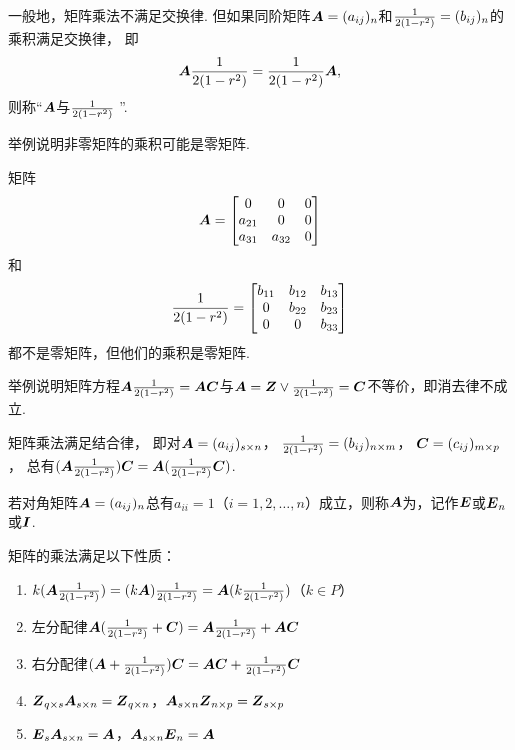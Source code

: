 \begin{definition}
一般地，矩阵乘法不满足交换律.
但如果同阶矩阵\(\A = (a_{ij})_n\)和\(\B = (b_{ij})_n\)的乘积满足交换律，
即\[
	\A \B = \B \A,
\]则称“\(\A\)与\(\B\) ”.
\end{definition}

\begin{example}
举例说明非零矩阵的乘积可能是零矩阵.
\begin{solution}
矩阵\[
\A = \begin{bmatrix}
0 & 0 & 0 \\
a_{21} & 0 & 0 \\
a_{31} & a_{32} & 0 \\
\end{bmatrix}
\]和\[
\B = \begin{bmatrix}
b_{11} & b_{12} & b_{13} \\
0 & b_{22} & b_{23} \\
0 & 0 & b_{33} \\
\end{bmatrix}
\]都不是零矩阵，但他们的乘积是零矩阵.
\end{solution}
\end{example}

\begin{example}
举例说明矩阵方程\(\A \B = \A \C\)与\(\A = \z \lor \B = \C\)不等价，即消去律不成立.
\end{example}

\begin{theorem}
矩阵乘法满足结合律，%
即对\(\A = (a_{ij})_{s \times n}\)，%
\(\B = (b_{ij})_{n \times m}\)，%
\(\C = (c_{ij})_{m \times p}\)，%
总有\((\A\B)\C = \A(\B\C)\).
\end{theorem}

\begin{definition}
若对角矩阵\(\A=(a_{ij})_n\)总有\(a_{ii} = 1\)（\(i=1,2,\dotsc,n\)）成立，则称\(\A\)为，记作\(\E\)或\(\E_n\)或\(\mat{I}\).
\end{definition}

\begin{property}
矩阵的乘法满足以下性质：
\begin{enumerate}
\item \(k(\A\B) = (k\A)\B = \A(k\B)\)（\(k \in P\)）
\item 左分配律\(\A(\B+\C) = \A\B + \A\C\)
\item 右分配律\((\A+\B)\C = \A\C + \B\C\)
\item \(\z_{q \times s} \A_{s \times n} = \z_{q \times n}\)，\(\A_{s \times n} \z_{n \times p} = \z_{s \times p}\)
\item \(\E_s \A_{s \times n} = \A\)，\(\A_{s \times n} \E_n = \A\)
\end{enumerate}
\end{property}


